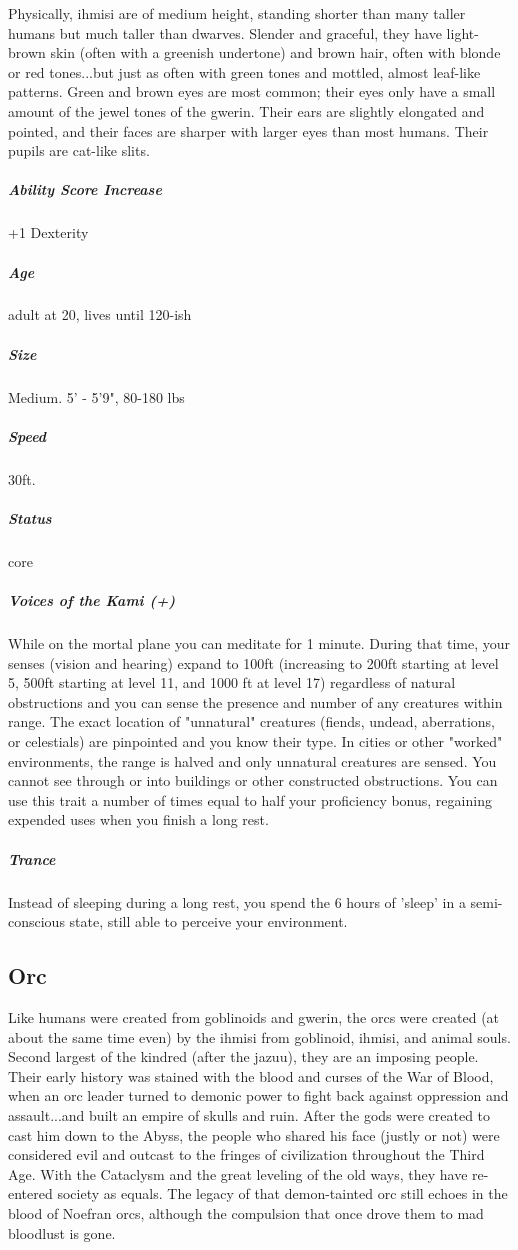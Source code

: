 Physically, ihmisi are of medium height, standing shorter than many taller humans but much taller than dwarves. Slender and graceful, they have light-brown skin (often with a greenish undertone) and brown hair, often with blonde or red tones...but just as often with green tones and mottled, almost leaf-like patterns. Green and brown eyes are most common; their eyes only have a small amount of the jewel tones of the gwerin. Their ears are slightly elongated and pointed, and their faces are sharper with larger eyes than most humans. Their pupils are cat-like slits.

\subparagraph*{Ability Score Increase}  +1 Dexterity
\subparagraph*{Age}  adult at 20, lives until 120-ish
\subparagraph*{Size}  Medium. 5' - 5'9", 80-180 lbs
\subparagraph*{Speed}  30ft.
\subparagraph*{Status}  core

\subparagraph*{Voices of the Kami (+)}  While on the mortal plane you can meditate for 1 minute. During that time, your senses (vision and hearing) expand to 100ft (increasing to 200ft starting at level 5, 500ft starting at level 11, and 1000 ft at level 17) regardless of natural obstructions and you can sense the presence and number of any creatures within range. The exact location of "unnatural" creatures (fiends, undead, aberrations, or celestials) are pinpointed and you know their type. In cities or other "worked" environments, the range is halved and only unnatural creatures are sensed. You cannot see through or into buildings or other constructed obstructions. You can use this trait a number of times equal to half your proficiency bonus, regaining expended uses when you finish a long rest.

\subparagraph*{Trance}  Instead of sleeping during a long rest, you spend the 6 hours of 'sleep' in a semi-conscious state, still able to perceive your environment.

\subsection{Orc} \label{lineage:orc}

Like humans were created from goblinoids and gwerin, the orcs were created (at about the same time even) by the ihmisi from goblinoid, ihmisi, and animal souls. Second largest of the kindred (after the jazuu), they are an imposing people. Their early history was stained with the blood and curses of the War of Blood, when an orc leader turned to demonic power to fight back against oppression and assault...and built an empire of skulls and ruin. After the gods were created to cast him down to the Abyss, the people who shared his face (justly or not) were considered evil and outcast to the fringes of civilization throughout the Third Age. With the Cataclysm and the great leveling of the old ways, they have re-entered society as equals. The legacy of that demon-tainted orc still echoes in the blood of Noefran orcs, although the compulsion that once drove them to mad bloodlust is gone.

